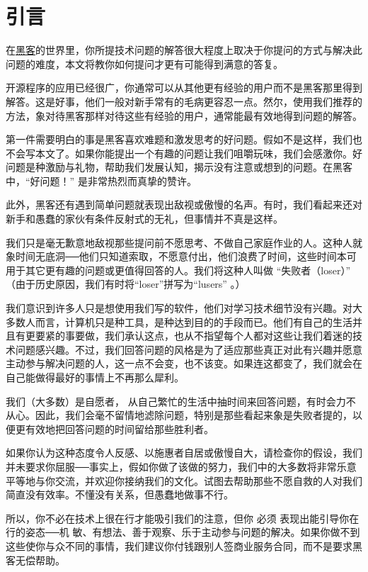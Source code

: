 \section{引言}


在\href{http://www.catb.org/~esr/faqs/hacker-howto.html}{黑客}的世界里，你所提技术问题的解答很大程度上取决于你提问的方式与解决此问题的难度，本文将教你如何提问才更有可能得到满意的答复。

开源程序的应用已经很广，你通常可以从其他更有经验的用户而不是黑客那里得到解答。这是好事，他们一般对新手常有的毛病更容忍一点。然尔，使用我们推荐的方法，象对待黑客那样对待这些有经验的用户，通常能最有效地得到问题的解答。

第一件需要明白的事是黑客喜欢难题和激发思考的好问题。假如不是这样，我们也不会写本文了。如果你能提出一个有趣的问题让我们咀嚼玩味，我们会感激你。好问题是种激励与礼物，帮助我们发展认知，揭示没有注意或想到的问题。在黑客中，“好问题！” 是非常热烈而真挚的赞许。

此外，黑客还有遇到简单问题就表现出敌视或傲慢的名声。有时，我们看起来还对新手和愚蠢的家伙有条件反射式的无礼，但事情并不真是这样。

我们只是毫无歉意地敌视那些提问前不愿思考、不做自己家庭作业的人。这种人就象时间无底洞──他们只知道索取，不愿意付出，他们浪费了时间，这些时间本可用于其它更有趣的问题或更值得回答的人。我们将这种人叫做 “失败者（loser）” （由于历史原因，我们有时将“loser”拼写为“lusers” 。）

我们意识到许多人只是想使用我们写的软件，他们对学习技术细节没有兴趣。对大多数人而言，计算机只是种工具，是种达到目的的手段而已。他们有自己的生活并且有更要紧的事要做，我们承认这点，也从不指望每个人都对这些让我们着迷的技术问题感兴趣。不过，我们回答问题的风格是为了适应那些真正对此有兴趣并愿意主动参与解决问题的人，这一点不会变，也不该变。如果连这都变了，我们就会在自己能做得最好的事情上不再那么犀利。

我们（大多数）是自愿者， 从自己繁忙的生活中抽时间来回答问题，有时会力不从心。因此，我们会毫不留情地滤除问题，特别是那些看起来象是失败者提的，以便更有效地把回答问题的时间留给那些胜利者。

如果你认为这种态度令人反感、以施惠者自居或傲慢自大，请检查你的假设，我们并未要求你屈服──事实上，假如你做了该做的努力，我们中的大多数将非常乐意平等地与你交流，并欢迎你接纳我们的文化。试图去帮助那些不愿自救的人对我们简直没有效率。不懂没有关系，但愚蠢地做事不行。

所以，你不必在技术上很在行才能吸引我们的注意，但你 必须 表现出能引导你在行的姿态──机 敏、有想法、善于观察、乐于主动参与问题的解决。如果你做不到这些使你与众不同的事情，我们建议你付钱跟别人签商业服务合同，而不是要求黑客无偿帮助。

